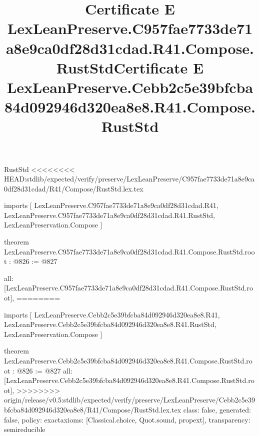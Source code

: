 \begin{lexlean}{RustStd}
<<<<<<<< HEAD:stdlib/expected/verify/preserve/LexLeanPreserve/C957fae7733de71a8e9ca0df28d31cdad/R41/Compose/RustStd.lex.tex
\title{Certificate E LexLeanPreserve.C957fae7733de71a8e9ca0df28d31cdad.R41.Compose.RustStd}
\begin{coremodule}
imports [
  LexLeanPreserve.C957fae7733de71a8e9ca0df28d31cdad.R41,
  LexLeanPreserve.C957fae7733de71a8e9ca0df28d31cdad.R41.RustStd,
  LexLeanPreservation.Compose
]

theorem LexLeanPreserve.C957fae7733de71a8e9ca0df28d31cdad.R41.Compose.RustStd.root : @826 := @827 {
  all: [LexLeanPreserve.C957fae7733de71a8e9ca0df28d31cdad.R41.Compose.RustStd.root],
========
\title{Certificate E LexLeanPreserve.Cebb2c5e39bfcba84d092946d320ea8e8.R41.Compose.RustStd}
\begin{coremodule}
imports [
  LexLeanPreserve.Cebb2c5e39bfcba84d092946d320ea8e8.R41,
  LexLeanPreserve.Cebb2c5e39bfcba84d092946d320ea8e8.R41.RustStd,
  LexLeanPreservation.Compose
]

theorem LexLeanPreserve.Cebb2c5e39bfcba84d092946d320ea8e8.R41.Compose.RustStd.root : @826 := @827 {
  all: [LexLeanPreserve.Cebb2c5e39bfcba84d092946d320ea8e8.R41.Compose.RustStd.root],
>>>>>>>> origin/release/v0.5:stdlib/expected/verify/preserve/LexLeanPreserve/Cebb2c5e39bfcba84d092946d320ea8e8/R41/Compose/RustStd.lex.tex
  class: false,
  generated: false,
  policy: exact{axioms: [Classical.choice, Quot.sound, propext]},
  transparency: semireducible
}


\end{coremodule}}
\end{coremodule}
\end{lexlean}
